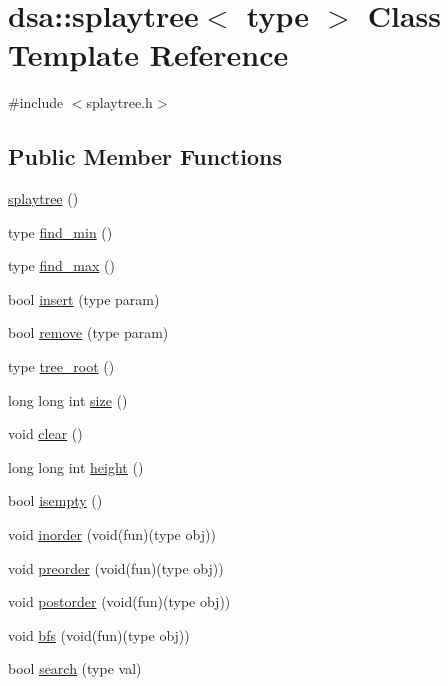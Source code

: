 \hypertarget{classdsa_1_1splaytree}{}\section{dsa\+:\+:splaytree$<$ type $>$ Class Template Reference}
\label{classdsa_1_1splaytree}


{\ttfamily \#include $<$splaytree.\+h$>$}

\subsection*{Public Member Functions}
\begin{DoxyCompactItemize}
\item 
\hyperlink{classdsa_1_1splaytree_a5eac748bc90f4b9ed911212fb861057c}{splaytree} ()
\item 
type \hyperlink{classdsa_1_1splaytree_a17cb06f5903351a44490312190e46fd1}{find\+\_\+min} ()
\item 
type \hyperlink{classdsa_1_1splaytree_aa15b92dd4d3129839c6dc4e10d054f26}{find\+\_\+max} ()
\item 
bool \hyperlink{classdsa_1_1splaytree_a93bd47920917dc58eee056fad4b4c8be}{insert} (type param)
\item 
bool \hyperlink{classdsa_1_1splaytree_aa5ab68a96a34c21964192b5ba6e45d74}{remove} (type param)
\item 
type \hyperlink{classdsa_1_1splaytree_a08fd5b97c35ca13bc4c21a5ad77ba464}{tree\+\_\+root} ()
\item 
long long int \hyperlink{classdsa_1_1splaytree_a1994f9177f129b3534e64506c39a6cde}{size} ()
\item 
void \hyperlink{classdsa_1_1splaytree_a04d036e1db3fd1d5daf00acd12aa790b}{clear} ()
\item 
long long int \hyperlink{classdsa_1_1splaytree_a1381e4c740c3371e184b75ccd27b618a}{height} ()
\item 
bool \hyperlink{classdsa_1_1splaytree_a40f0b3c2040161d70865129be7fb33c5}{isempty} ()
\item 
void \hyperlink{classdsa_1_1splaytree_abfd1daa0395ad387ccee9fc76f48b45a}{inorder} (void(fun)(type obj))
\item 
void \hyperlink{classdsa_1_1splaytree_a251217acc123c990a5a52aca36a76028}{preorder} (void(fun)(type obj))
\item 
void \hyperlink{classdsa_1_1splaytree_aab34ce58381a447ccbe1b8370bc2cd0e}{postorder} (void(fun)(type obj))
\item 
void \hyperlink{classdsa_1_1splaytree_a119c5ccc2c2e212d65e81c864ff420d3}{bfs} (void(fun)(type obj))
\item 
bool \hyperlink{classdsa_1_1splaytree_a4e92bfd8b941f3a9956c904df3e2bdf3}{search} (type val)
\end{DoxyCompactItemize}


